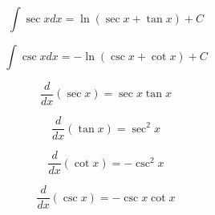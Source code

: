 \documentclass[a4paper,9pt]{scrartcl}
\begin{document}
    \begin{displaymath}
        \int{\sec{x}}dx = \ln{(\sec{x} + \tan{x})} + C
    \end{displaymath}

    \begin{displaymath}
        \int{\csc{x}}dx = -\ln({\csc{x} + \cot{x}}) + C
    \end{displaymath}

    \begin{displaymath}
        \frac{d}{dx}(\sec{x}) = \sec{x}\tan{x}
    \end{displaymath}

    \begin{displaymath}
        \frac{d}{dx}(\tan{x}) = \sec^2{x}
    \end{displaymath}

    \begin{displaymath}
        \frac{d}{dx}(\cot{x}) = -\csc^2{x}
    \end{displaymath}

    \begin{displaymath}
        \frac{d}{dx}(\csc{x}) = -\csc{x}\cot{x}
    \end{displaymath}
\end{document}
